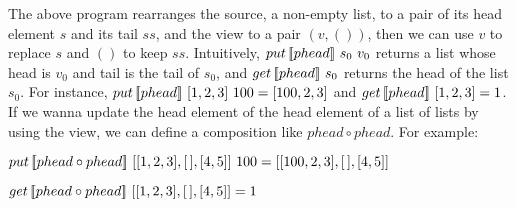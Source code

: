 The above program rearranges the source, a non-empty list, to a pair of its head element $s$ and its tail $ss$, and the view to a pair $(v, ())$, then we can use $v$ to replace $s$ and $()$ to keep $ss$. Intuitively, $put \, [\![phead]\!] \ s_0 \ v_0$ returns a list whose head is $v_0$ and tail is the tail of $s_0$, and $get \, [\![phead]\!] \ s_0$ returns the head of the list $s_0$. For instance, $put \, [\![phead]\!] \ [1,2,3] \ 100 = [100,2,3]$ and $get \, [\![phead]\!] \ [1,2,3] = 1$. If we wanna update the head element of the head element of a list of lists by using the view, we can define a composition like $phead \circ phead$. For example:

$put \, [\![phead \circ phead]\!] \ [[1,2,3],[\,],[4,5]] \ 100 = [[100,2,3],[\,],[4,5]]$

$get \, [\![phead \circ phead]\!] \ [[1,2,3],[\,],[4,5]] = 1$

